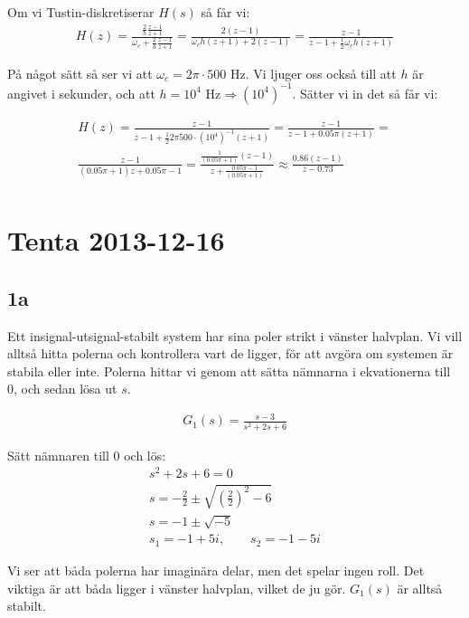 \documentclass[a4paper]{article}
\newcommand{\oklarhet}[1]{%
  \noindent\fbox{\parbox[b][2em][t]{\textwidth}{\color{red}#1} }%
}
\begin{document}
Om vi Tustin-diskretiserar $H(s)$ så får vi:
\begin{align*}
  H(z) = \frac{\frac{2}{h} \frac{z - 1}{z + 1}}{\omega_c + \frac{2}{h} \frac{z - 1}{z + 1}} = \frac{2(z - 1)}{\omega_c h (z+1) + 2(z-1)} = \frac{z-1}{z-1 + \frac{1}{2} \omega_c h (z+1)}
\end{align*}

På något sätt så ser vi att $\omega_c = 2\pi \cdot 500$ Hz. Vi ljuger oss också till att $h$ är angivet i sekunder, och att $h = 10^4 \text{ Hz} \Rightarrow (10^4)^{-1}$. Sätter vi in det så får vi:\\
\oklarhet{Hur gick det till?}

\begin{align*}
  H(z) = \frac{z-1}{z-1 + \frac{1}{2} 2\pi 500 \cdot (10^4)^{-1} (z+1)} = \frac{z-1}{z-1 + 0.05 \pi (z+1)} = \\
  \frac{z-1}{(0.05\pi + 1)z + 0.05 \pi -1} = \frac{\frac{1}{(0.05\pi + 1)}(z-1)}{z + \frac{0.05 \pi -1}{(0.05\pi + 1)}} \approx \frac{0.86(z-1)}{z-0.73}\\
\end{align*}

\section{Tenta 2013-12-16}
\subsection{1a}
Ett insignal-utsignal-stabilt system har sina poler strikt i vänster halvplan. Vi vill alltså hitta polerna och kontrollera vart de ligger, för att avgöra om systemen är stabila eller inte. Polerna hittar vi genom att sätta nämnarna i ekvationerna till 0, och sedan lösa ut $s$.

\begin{align*}
  G_1(s) = \frac{s-3}{s^2+2s+6}
\end{align*}

Sätt nämnaren till 0 och lös:
\begin{align*}
  s^2+2s+6 = 0\\
  s = -\frac{2}{2} \pm \sqrt{\left(\frac{2}{2}\right)^2 -6}\\
  s = -1 \pm \sqrt{-5}\\
  s_1 = -1 + 5i, \qquad s_2 = -1 - 5i
\end{align*}

Vi ser att båda polerna har imaginära delar, men det spelar ingen roll. Det viktiga är att båda ligger i vänster halvplan, vilket de ju gör. $G_1(s)$ är alltså stabilt.
\end{document}
